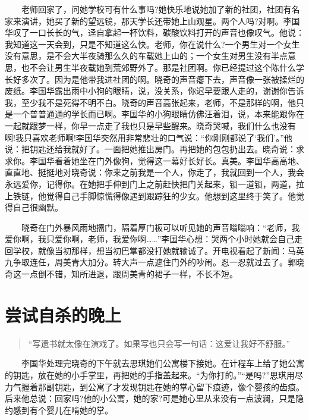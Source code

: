 \documentclass[12pt,UTF8]{ctexbook}
\begin{document}
　　老师回家了，问她学校可有什么事吗?她快乐地说她加了新的社团，社团有名家来演讲，她买了新的望远镜，那天学长还带她上山观星。两个人吗?对啊。李国华叹了一口长长的气，迳自拿起一杯饮料，碳酸饮料打开的声音也像叹气。他说：我知道这一天会到，只是不知道这么快。老师，你在说什么?一个男生对一个女生没有意思，是不会大半夜骑那么久的车载她上山的；一个女生对男生没有半点意思，也不会让男生半夜载她到荒郊野外了。那是社团啊。你已经提过这个陈什么学长好多次了。因为是他带我进社团的啊。晓奇的声音瘪下去，声音像一张被揉烂的废纸。李国华露出雨中小狗的眼睛，说，没关系，你迟早要跟人走的，谢谢你告诉我，至少我不是死得不明不白。晓奇的声音高张起来，老师，不是那样的啊，他只是一个普普通通的学长而已啊。李国华的小狗眼睛仿佛汪着泪，说，本来能跟你在一起就跟梦一样，你早一点走了我也只是早些醒来。晓奇哭喊，我们什么也没有啊!我只喜欢老师啊!李国华突然用非常悲壮的口气说：\enquote{你刚刚都说了`我们'。}他说：把钥匙还给我就好了。一面把她推出房门。再把她的包包扔出去。晓奇说：求求你。李国华看着她坐在门外像狗，觉得这一幕好长好长。真美。李国华高高地、直直地、挺挺地对晓奇说：你来之前我是一个人，你走了，我就回到一个人，我会永远爱你，记得你。在她把手伸到门上之前赶快把门关起来，锁一道锁，两道，拉上铁链，他觉得自己手脚惊慌得像遇到跟踪狂的少女。他想到这里终于笑了。他觉得自己很幽默。

　　晓奇在门外暴风雨地擂门，隔着厚门板可以听见她的声音嗡嗡响：\enquote{老师，我爱你啊，我只爱你啊，老师，我爱你啊\ldots{}\ldots{}}李国华心想：哭两个小时她就会自己走回学校，就像当初那样，想当初巴掌都没打她就输诚了。开电视看起了新闻：马英九争取连任，周美青大加分。转大声一点遮住门外的吵闹。忍一忍就过去了。郭晓奇这一点倒不错，知所进退，跟周美青的裙子一样，不长不短。

\hypertarget{ux5c1dux8bd5ux81eaux6740ux7684ux665aux4e0a}{%
\section*{尝试自杀的晚上}\label{ux5c1dux8bd5ux81eaux6740ux7684ux665aux4e0a}}

\begin{quote}
\enquote{写遗书就太像在演戏了。如果写也只会写一句话：这爱让我好不舒服。}
\end{quote}

　　李国华处理完晓奇的下午就去思琪她们公寓楼下接她。在计程车上给了她公寓的钥匙，放在她的小手掌里，再把她的手指盖起来。\enquote{为你打的。}\enquote{是吗?}思琪用尽力气握着那副钥匙，到公寓了才发现钥匙在她的掌心留下痕迹，像个婴孩的齿痕。后来他总说：回家吗?他的小公寓，她的家?可是她心里从来没有一点波澜，只是隐约感到有个婴儿在啃她的掌。
\end{document}
